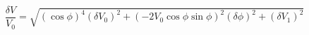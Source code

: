 \begin{equation}
\label{eq:delta_V_Malus}
\frac{\delta V}{V_0} = \sqrt{ \left(\cos{\phi}\right)^4(\delta V_0)^2 + \left(-2 V_0 \cos{\phi}\sin{\phi} \right)^2(\delta \phi)^2+ (\delta V_1)^2}
\end{equation}